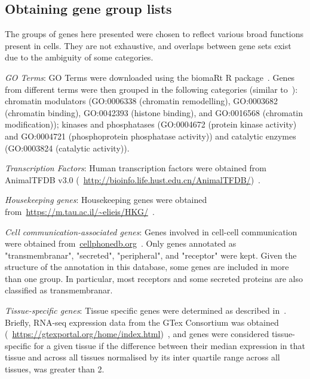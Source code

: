 \subsection{Obtaining gene group lists}
\label{section4.4_genelists}
The groups of genes here presented were chosen to reflect various broad functions present in cells. They are not exhaustive, and overlaps between gene sets exist due to the ambiguity of some categories.

\textit{GO Terms}: GO Terms were downloaded using the biomaRt R package~\citep{durinck_mapping_2009}. Genes from different terms were then grouped in the following categories (similar to~\citep{hagai_gene_2018}): chromatin modulators (GO:0006338 (chromatin remodelling), GO:0003682 (chromatin binding), GO:0042393 (histone binding), and GO:0016568 (chromatin modification)); kinases and phosphatases (GO:0004672 (protein kinase activity) and GO:0004721 (phosphoprotein phosphatase activity)) and catalytic enzymes (GO:0003824 (catalytic activity)).

\textit{Transcription Factors}: Human transcription factors were obtained from AnimalTFDB v3.0 (~\url{http://bioinfo.life.hust.edu.cn/AnimalTFDB/})~\citep{hu_animaltfdb_2019}.

\textit{Housekeeping genes}: Housekeeping genes were obtained from~\url{https://m.tau.ac.il/~elieis/HKG/}~\citep{eisenberg_human_2013}.

\textit{Cell communication-associated genes}: Genes involved in cell-cell communication were obtained from~\url{cellphonedb.org}~\citep{efremova_cellphonedb_2019}. Only genes annotated as "transmembranar", "secreted", "peripheral", and "receptor" were kept. Given the structure of the annotation in this database, some genes are included in more than one group. In particular, most receptors and some secreted proteins are also classified as transmembranar.

\textit{Tissue-specific genes}: Tissue specific genes were determined as described in~\citep{sonawane_understanding_2017}. Briefly, RNA-seq expression data from the GTex Consortium was obtained (~\url{https://gtexportal.org/home/index.html})~\citep{consortium_genotype-tissue_2015}, and genes were considered tissue-specific for a given tissue if the difference between their median expression in that tissue and across all tissues normalised by its inter quartile range across all tissues, was greater than 2.


